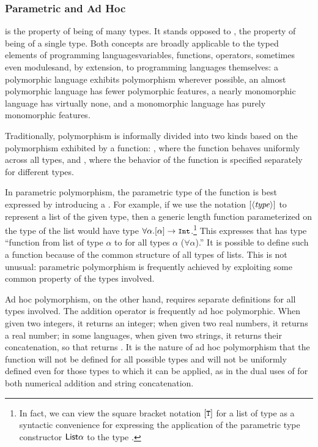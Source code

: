 \subsubsection{Parametric and Ad Hoc}
 is the property of being of many types. It stands opposed to , the property of being of a single type. Both concepts are broadly applicable to the typed elements of programming languages\empause variables, functions, operators, sometimes even modules\empause and, by extension, to programming languages themselves: a polymorphic language exhibits polymorphism wherever possible, an almost polymorphic language has fewer polymorphic features, a nearly monomorphic language has virtually none, and a monomorphic language has purely monomorphic features.

Traditionally, polymorphism is informally divided into two kinds based on the polymorphism exhibited by a function: , where the function behaves uniformly across all types, and , where the behavior of the function is specified separately for different types.

In parametric polymorphism, the parametric type of the function is best expressed by introducing a . For example, if we use the notation $[\langle \text{\textit{type}} \rangle]$ to represent a list of the given type, then a generic length function parameterized on the type of the list would have type $\forall \alpha. [\alpha] \to \text{\text{\small\ttfamily Int}}$.\footnote{In fact, we can view the square bracket notation $[\text{\text{\small\ttfamily T}}\/]$ for a list of type  as a syntactic convenience for expressing the application of the parametric type constructor $\text{\textsf{List}} \alpha$ to the type .} This expresses that  has type ``function from list of type $\alpha$ to  for all types $\alpha$ ($\forall \alpha$).'' It is possible to define such a function because of the common structure of all types of lists. This is not unusual: parametric polymorphism is frequently achieved by exploiting some common property of the types involved.

Ad hoc polymorphism, on the other hand, requires separate definitions for all types involved. The addition operator \code{+} is frequently ad hoc polymorphic. When given two integers, it returns an integer; when given two real numbers, it returns a real number; in some languages, when given two strings, it returns their concatenation, so that  returns . It is the nature of ad hoc polymorphism that the function will not be defined for all possible types and will not be uniformly defined even for those types to which it can be applied, as in the dual uses of \code{+} for both numerical addition and string concatenation.

